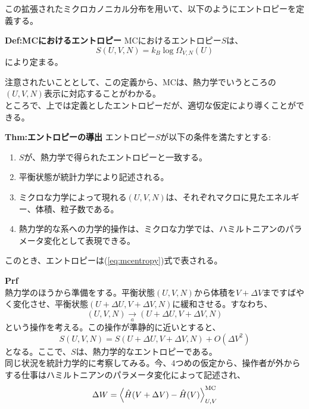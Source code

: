 \documentclass[a4paper,11pt]{jsarticle}
\numberwithin{equation}{section}
\begin{document}
この拡張されたミクロカノニカル分布を用いて、以下のようにエントロピーを定義する。\\
\begin{itembox}[l]{\textbf{Def:MCにおけるエントロピー}}
  MCにおけるエントロピー$S$は、
  \begin{equation}
    S(U,V,N) = k_{B} \log \Omega_{V,N}(U) \label{eq:mcentropy}
  \end{equation}
  により定まる。

\end{itembox}
注意されたいこととして、この定義から、MCは、熱力学でいうところの$(U,V,N)$表示に対応することがわかる。\\
ところで、上では定義としたエントロピーだが、適切な仮定により導くことができる。\\

\begin{itembox}[l]{\textbf{Thm:エントロピーの導出}}
  エントロピー$S$が以下の条件を満たすとする:
  \begin{enumerate}
    \item $S$が、熱力学で得られたエントロピーと一致する。
    \item 平衡状態が統計力学により記述される。
    \item ミクロな力学によって現れる$(U,V,N)$は、それぞれマクロに見たエネルギー、体積、粒子数である。
    \item 熱力学的な系への力学的操作は、ミクロな力学では、ハミルトニアンのパラメータ変化として表現できる。
  \end{enumerate}
  このとき、エントロピーは(\ref{eq:mcentropy})式で表される。
\end{itembox}
\textbf{Prf}\\
熱力学のほうから準備をする。平衡状態$(U,V,N)$から体積を$V+\Delta V$まですばやく変化させ、平衡状態$(U+\Delta U,V+\Delta V,N)$に緩和させる。すなわち、
\begin{equation}
  (U,V,N) \underset{a}{\rightarrow} (U+\Delta U,V+\Delta V,N) 
\end{equation}
という操作を考える。この操作が準静的に近いとすると、
\begin{equation}
  S(U,V,N) = S(U+\Delta U,V+\Delta V,N) + O(\Delta V ^2)
\end{equation}
となる。ここで、$S$は、熱力学的なエントロピーである。\\
同じ状況を統計力学的に考察してみる。今、4つめの仮定から、操作者が外からする仕事はハミルトニアンのパラメータ変化によって記述され、
\begin{equation}
  \Delta W = \expval{\hat{H}(V+\Delta V)-\hat{H}(V)}_{U,V}^{\text{MC}}
\end{equation}
\end{document}

